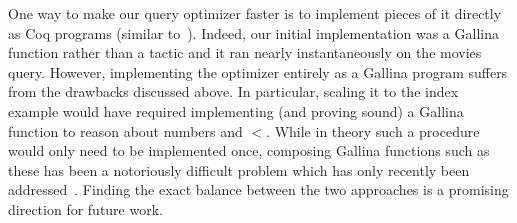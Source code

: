 \documentclass{sigplanconf}
\begin{document}
One way to make our query optimizer faster is to implement pieces of it directly as Coq programs (similar to~\cite{coqdb}).
Indeed, our initial implementation was a Gallina function rather than a tactic and it ran nearly instantaneously on the movies query.
However, implementing the optimizer entirely as a Gallina program suffers from the drawbacks discussed above.
In particular, scaling it to the index example would have required implementing (and proving sound) a Gallina function to reason about numbers and $<$.
While in theory such a procedure would only need to be implemented once, composing Gallina functions such as these has been a notoriously difficult problem which has only recently been addressed~\cite{malecha2014mirror-shard}.
Finding the exact balance between the two approaches is a promising direction for future work.

%
%


\end{document}
